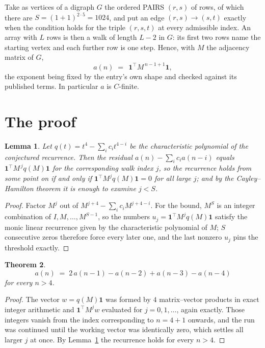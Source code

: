 \documentclass[11pt,a4paper]{article}
\theoremstyle{plain}
\newtheorem{theorem}{Theorem}
\newtheorem{lemma}[theorem]{Lemma}
\theoremstyle{definition}
\begin{document}
Take as vertices of a digraph $G$ the ordered PAIRS $(r,s)$ of rows, of which there are
$S=(1+1)^{2\cdot5}=1024$, and put an edge $(r,s)\to(s,t)$ exactly when the condition
holds for the triple $(r,s,t)$ at every admissible index. An array with $L$ rows is then a
walk of length $L-2$ in $G$: its first two rows name the starting vertex and each further
row is one step. Hence, with $M$ the adjacency matrix of $G$,
\[
a(n)\;=\;\,\mathbf{1}^{\!\top}M^{\,n-1+1}\mathbf{1},
\]
the exponent being fixed by the entry's own shape and checked against its published terms.
In particular $a$ is $C$-finite.

\section{The proof}

\begin{lemma}\label{lem:crit}
Let $q(t)=t^{4}-\sum_i c_it^{4-i}$ be the characteristic polynomial of the
conjectured recurrence. Then the residual $a(n)-\sum_ic_ia(n-i)$ equals
$\mathbf{1}^{\!\top}M^{\,j}q(M)\mathbf{1}$ for the corresponding walk index
$j$, so the recurrence holds from some point on if and only if
$\mathbf{1}^{\!\top}M^{j}q(M)\mathbf{1}=0$ for all large $j$; and by the
Cayley--Hamilton theorem it is enough to examine $j<S$.
\end{lemma}

\begin{proof}
Factor $M^{j}$ out of $M^{j+4}-\sum_ic_iM^{j+4-i}$. For the bound, $M^{S}$
is an integer combination of $I,M,\dots,M^{S-1}$, so the numbers
$u_j=\mathbf{1}^{\!\top}M^{j}q(M)\mathbf{1}$ satisfy the monic linear recurrence given by
the characteristic polynomial of $M$; $S$ consecutive zeros therefore force every later one,
and the last nonzero $u_j$ pins the threshold exactly.
\end{proof}

\begin{theorem}
\[
a(n)\;=\;2\,a(n-1) - a(n-2) + a(n-3) - a(n-4)
\]
for every $n>4$.
\end{theorem}

\begin{proof}
The vector $w=q(M)\mathbf{1}$ was formed by $4$ matrix--vector products in exact
integer arithmetic and $\mathbf{1}^{\!\top}M^{j}w$ evaluated for $j=0,1,\dots$, again
exactly. Those integers vanish from the index corresponding to $n=4+1$ onwards, and the
run was continued until the working vector was identically zero, which settles all larger $j$
at once. By Lemma~\ref{lem:crit} the recurrence holds for every $n>4$.
\end{proof}
\end{document}
